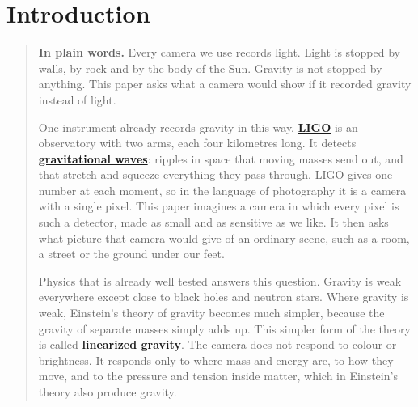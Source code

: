 \section{Introduction}\label{sec:introduction}

\begin{quote}
\textbf{In plain words.} Every camera we use records light. Light is stopped by
walls, by rock and by the body of the Sun. Gravity is not stopped by anything.
This paper asks what a camera would show if it recorded gravity instead of
light.

One instrument already records gravity in this way.
\textbf{\href{https://en.wikipedia.org/wiki/LIGO}{LIGO}} is an observatory with
two arms, each four kilometres long. It detects
\textbf{\href{https://en.wikipedia.org/wiki/Gravitational_wave}{gravitational
waves}}: ripples in space that moving masses send out, and that stretch and
squeeze everything they pass through. LIGO gives one number at each moment, so
in the language of photography it is a camera with a single pixel. This paper
imagines a camera in which every pixel is such a detector, made as small and as
sensitive as we like. It then asks what picture that camera would give of an
ordinary scene, such as a room, a street or the ground under our feet.

Physics that is already well tested answers this question. Gravity is weak
everywhere except close to black holes and neutron stars. Where gravity is
weak, Einstein's theory of gravity becomes much simpler, because the gravity of
separate masses simply adds up. This simpler form of the theory is called
\textbf{\href{https://en.wikipedia.org/wiki/Linearized_gravity}{linearized
gravity}}. The camera does not respond to colour or brightness. It responds
only to where mass and energy are, to how they move, and to the pressure and
tension inside matter, which in Einstein's theory also produce gravity.


\end{quote}
